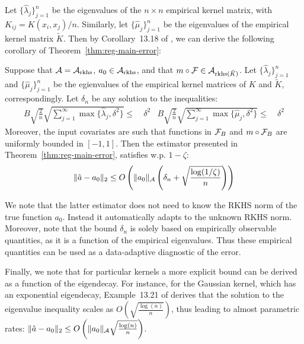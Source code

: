 Let $\{\hat{\lambda}_j\}_{j=1}^n$ be the eigenvalues of the $n\times n$ empirical kernel matrix, with $K_{ij}=K(x_i, x_j)/n$. Similarly, let $\{\hat{\mu}_j\}_{j=1}^n$ be the eigenvalues of the empirical kernel matrix $\tilde{K}$. Then by Corollary~13.18 of \cite{wainwright2019high}, we can derive the following corollary of Theorem~\ref{thm:reg-main-error}:
\begin{corollary}
    Suppose that ${\mathcal A}={\mathcal A}_{\text{rkhs}}$, $a_0\in {\mathcal A}_{\text{rkhs}}$, and that $m\circ {\mathcal F}\in {\mathcal A}_{\text{rkhs}(\tilde{K})}$. Let $\{\hat{\lambda}_j\}_{j=1}^n$ and $\{\hat{\mu}_j\}_{j=1}^n$ be  the egienvalues of the empirical kernel matrices of $K$ and $\tilde{K}$, correspondingly. Let $\delta_n$ be any solution to the inequalities:
    \begin{align}
        B\sqrt{\frac{2}{n}}\sqrt{\sum_{j=1}^\infty \max\{\hat{\lambda}_j, \delta^2\}}\leq~& \delta^2 &
        B\sqrt{\frac{2}{n}}\sqrt{\sum_{j=1}^\infty \max\{\hat{\mu}_j, \delta^2\}}\leq~& \delta^2
    \end{align}
    Moreover, the input covariates are such that functions in ${\mathcal F}_B$ and $m\circ {\mathcal F}_B$ are uniformly bounded in $[-1, 1]$. Then the estimator presented in Theorem~\ref{thm:reg-main-error}, satisfies w.p. $1-\zeta$:
    \begin{equation}
        \|\hat{a}-a_0\|_{2} \leq O\left(\|a_0\|_{{\mathcal A}} \left( \delta_n + \sqrt{\frac{\log(1/\zeta)}{n}}\right)\right)
    \end{equation}
\end{corollary}

We note that the latter estimator does not need to know the RKHS norm of the true function $a_0$. Instead it automatically adapts to the unknown RKHS norm. Moreover, note that the bound $\delta_n$ is solely based on empirically observable quantities, as it is a function of the empirical eigenvalues. Thus these empirical quantities can be used as a data-adaptive diagnostic of the error.

Finally, we note that for particular kernels a more explicit bound can be derived as a function of the eigendecay. For instance, for the Gaussian kernel, which has an exponential eigendecay, Example~13.21 of \cite{wainwright2019high} derives that the solution to the eigenvalue inequality scales as $O\left(\sqrt{\frac{\log(n)}{n}}\right)$, thus leading to almost parametric rates: $\|\hat{a}-a_0\|_2 \leq O\left(\|a_0\|_{{\mathcal A}} \sqrt{\frac{\log(n)}{n}}\right)$.
